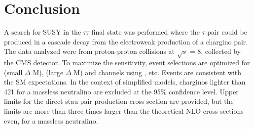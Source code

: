 \section{Conclusion}
\label{sect:conclusion}
A search for SUSY in the $\tau\tau$ final state was performed where the
$\tau$ pair could be produced in a cascade decay from the electroweak production of a chargino pair.  The data analyzed were from proton-proton collisions
at $\sqrt{s}$ = 8\TeV, collected by the CMS detector.
To maximize the sensitivity, event selections are optimized for \tauTau (small $\Delta$ M), 
\tauTau (large $\Delta$ M) and \leptonTau channels using \mttwo, etc. %
Events are consistent with the SM expectations. 
In the context of simplified models, charginos lighter than 421\GeV 
for a massless neutralino  are excluded at the 95\% confidence level.
Upper limits for the direct stau pair production cross section are provided, but the limits are more than three times
larger than the theoretical NLO cross sections 
even, for a massless neutralino.


